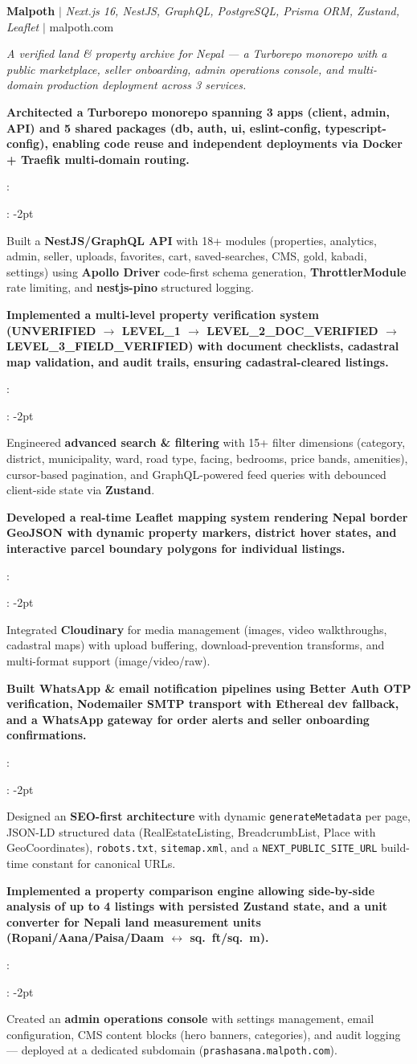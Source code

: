 \documentclass[a4paper,11pt]{article}
\newcommand{\resumeItem}[2]{
  \item\small{
    \textbf{#1}{: #2 \vspace{-2pt}}
  }
}
\newcommand{\resumeItemListStart}{\begin{itemize}}
\newcommand{\resumeItemListEnd}{\end{itemize}\vspace{-5pt}}
\begin{document}
\resumeProjectHeading
{\textbf{Malpoth} $|$ \emph{Next.js 16, NestJS, GraphQL, PostgreSQL, Prisma ORM, Zustand, Leaflet} \hfill $|$ malpoth.com}
{}

{\small\textit{A verified land \& property archive for Nepal --- a Turborepo monorepo with a public marketplace, seller onboarding, admin operations console, and multi-domain production deployment across 3 services.}}

\resumeItemListStart
  \resumeItem{Architected a \textbf{Turborepo monorepo} spanning \textbf{3 apps} (client, admin, API) and \textbf{5 shared packages} (db, auth, ui, eslint-config, typescript-config), enabling code reuse and independent deployments via Docker + Traefik multi-domain routing.}
  \resumeItem{Built a \textbf{NestJS/GraphQL API} with 18+ modules (properties, analytics, admin, seller, uploads, favorites, cart, saved-searches, CMS, gold, kabadi, settings) using \textbf{Apollo Driver} code-first schema generation, \textbf{ThrottlerModule} rate limiting, and \textbf{nestjs-pino} structured logging.}
  \resumeItem{Implemented a \textbf{multi-level property verification system} (UNVERIFIED $\rightarrow$ LEVEL\_1 $\rightarrow$ LEVEL\_2\_DOC\_VERIFIED $\rightarrow$ LEVEL\_3\_FIELD\_VERIFIED) with document checklists, cadastral map validation, and audit trails, ensuring cadastral-cleared listings.}
  \resumeItem{Engineered \textbf{advanced search \& filtering} with 15+ filter dimensions (category, district, municipality, ward, road type, facing, bedrooms, price bands, amenities), cursor-based pagination, and GraphQL-powered feed queries with debounced client-side state via \textbf{Zustand}.}
  \resumeItem{Developed a \textbf{real-time Leaflet mapping system} rendering Nepal border GeoJSON with dynamic property markers, district hover states, and interactive parcel boundary polygons for individual listings.}
  \resumeItem{Integrated \textbf{Cloudinary} for media management (images, video walkthroughs, cadastral maps) with upload buffering, download-prevention transforms, and multi-format support (image/video/raw).}
  \resumeItem{Built \textbf{WhatsApp \& email notification pipelines} using \textbf{Better Auth} OTP verification, \textbf{Nodemailer} SMTP transport with Ethereal dev fallback, and a WhatsApp gateway for order alerts and seller onboarding confirmations.}
  \resumeItem{Designed an \textbf{SEO-first architecture} with dynamic \texttt{generateMetadata} per page, JSON-LD structured data (RealEstateListing, BreadcrumbList, Place with GeoCoordinates), \texttt{robots.txt}, \texttt{sitemap.xml}, and a \texttt{NEXT\_PUBLIC\_SITE\_URL} build-time constant for canonical URLs.}
  \resumeItem{Implemented a \textbf{property comparison engine} allowing side-by-side analysis of up to 4 listings with persisted Zustand state, and a \textbf{unit converter} for Nepali land measurement units (Ropani/Aana/Paisa/Daam $\leftrightarrow$ sq.\ ft/sq.\ m).}
  \resumeItem{Created an \textbf{admin operations console} with settings management, email configuration, CMS content blocks (hero banners, categories), and audit logging --- deployed at a dedicated subdomain (\texttt{prashasana.malpoth.com}).}
\resumeItemListEnd
\end{document}
